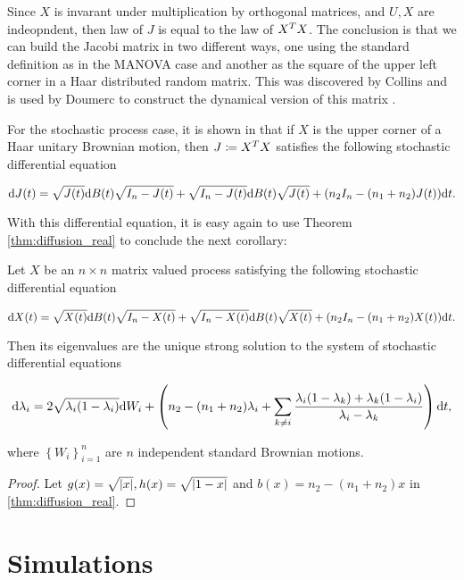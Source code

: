 Since $X$ is invarant under multiplication by orthogonal matrices, and $U,X$ are indeopndent, then law of $J$ is equal to the law of $X^T X$. The conclusion is that we can build the Jacobi matrix in two different ways, one using the standard definition as in the MANOVA case and another as the square of the upper left corner in a Haar distributed random matrix. This was discovered by Collins \cite{thesis:collins} and is used by Doumerc to construct the dynamical version of this matrix \cite{doumerc2005matrices}.

For the stochastic process case, it is shown in \cite{doumerc2005matrices} that if $X$ is the upper corner of a Haar unitary Brownian motion, then $J \coloneqq X^T X$ satisfies the following stochastic differential equation

\begin{equation*}
    \mathrm d J (t) = \sqrt{J(t)} \mathrm d B(t) \sqrt{I_n - J(t)} + \sqrt{I_n - J(t)} \mathrm d B(t) \sqrt{J(t)} + (n_2 I_n - (n_1 + n_2) J(t) ) \mathrm d t.
\end{equation*}

With this differential equation, it is easy again to use Theorem \ref{thm:diffusion_real} to conclude the next corollary: 

\begin{corollary}
    Let $X$ be an $n\times n$ matrix valued process satisfying the following stochastic differential equation

    \begin{equation*}
        \mathrm d X (t) = \sqrt{X(t)} \mathrm d B(t) \sqrt{I_n - X(t)} + \sqrt{I_n - X(t)} \mathrm d B(t) \sqrt{X(t)} + (n_2 I_n - (n_1 + n_2) X(t) ) \mathrm d t.
    \end{equation*}

    Then its eigenvalues are the unique strong solution to the system of stochastic differential equations

    \begin{equation} \label{eq:jacobi}
        \mathrm d \lambda_i = 2 \sqrt{\lambda_i(1-\lambda_i)} \mathrm d W_i + \left( n_2 -(n_1 + n_2)\lambda_i + \sum_{k\neq i} \frac{\lambda_i(1-\lambda_k) + \lambda_k(1-\lambda_i)}{\lambda_i - \lambda_k} \right) \mathrm d t,
    \end{equation}

    \noindent where $\left\{ W_{i} \right\}_{i=1}^n$ are $n$ independent standard Brownian motions.
\end{corollary}

\begin{proof}
    Let $g(x) = \sqrt{\lvert x \rvert}, h(x) = \sqrt{\lvert 1-x \rvert}$ and $b(x) = n_2 - (n_1 + n_2)x$ in \ref{thm:diffusion_real}. 
\end{proof}


\section{Simulations}